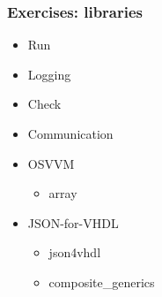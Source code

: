 \documentclass[xcolor={usenames,dvipsnames,svgnames}]{beamer}
\begin{document}
\begin{frame}
\frametitle{Exercises: libraries}
\begin{itemize}
  \item Run
  \href{http://vunit.github.io/run/user_guide.html}{\faBook}
  \href{https://github.com/VUnit/vunit/tree/master/examples/vhdl/run}{\faCode}

  \vfill

  \item Logging
  \href{http://vunit.github.io/logging/user_guide.html}{\faBook}
  \href{https://github.com/VUnit/vunit/tree/master/examples/vhdl/logging}{\faCode}

  \vfill

  \item Check
  \href{http://vunit.github.io/check/user_guide.html}{\faBook}
  \href{https://github.com/VUnit/vunit/tree/master/examples/vhdl/check}{\faCode}

  \vfill

  \item Communication
  \href{http://vunit.github.io/com/user_guide.html}{\faBook}
  \href{https://github.com/VUnit/vunit/tree/master/examples/vhdl/com/}{\faCode}

  \vfill

  \item OSVVM
  \begin{itemize}
    \item array
    \href{https://github.com/VUnit/vunit/tree/master/examples/vhdl/array}{\faCode}
  \end{itemize}

  \vfill

  \item JSON-for-VHDL
  \begin{itemize}
    \item json4vhdl
    \href{https://github.com/VUnit/vunit/tree/master/examples/vhdl/json4vhdl}{\faCode}
    \item composite\_generics
    \href{https://github.com/VUnit/vunit/tree/master/examples/vhdl/composite_generics}{\faCode}
  \end{itemize}
\end{itemize}
\vfill
\end{frame}
\end{document}

